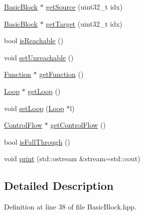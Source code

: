 \begin{DoxyCompactItemize}
\item 
\hyperlink{class_e_p_a_x_1_1_basic_block}{\-Basic\-Block} $\ast$ \hyperlink{class_e_p_a_x_1_1_basic_block_a9b7d0cd1393c05a1953a220656397e32}{get\-Source} (uint32\-\_\-t idx)
\item 
\hyperlink{class_e_p_a_x_1_1_basic_block}{\-Basic\-Block} $\ast$ \hyperlink{class_e_p_a_x_1_1_basic_block_a512b57294aa6304a46dbe6078a3136c6}{get\-Target} (uint32\-\_\-t idx)
\item 
bool \hyperlink{class_e_p_a_x_1_1_basic_block_a88793cef3edbefc895901a79a13960af}{is\-Reachable} ()
\item 
void \hyperlink{class_e_p_a_x_1_1_basic_block_a66989faa2f50f05ef54f590804da67d6}{set\-Unreachable} ()
\item 
\hyperlink{class_e_p_a_x_1_1_function}{\-Function} $\ast$ \hyperlink{class_e_p_a_x_1_1_basic_block_a4093d6913b2268f3598001afdcea64be}{get\-Function} ()
\item 
\hyperlink{class_e_p_a_x_1_1_loop}{\-Loop} $\ast$ \hyperlink{class_e_p_a_x_1_1_basic_block_a52b1b3f29e3e9a3b2e5bf5fc0b9057b4}{get\-Loop} ()
\item 
void \hyperlink{class_e_p_a_x_1_1_basic_block_a068cccb297ebae18119a804a2474e45a}{set\-Loop} (\hyperlink{class_e_p_a_x_1_1_loop}{\-Loop} $\ast$l)
\item 
\hyperlink{class_e_p_a_x_1_1_control_flow}{\-Control\-Flow} $\ast$ \hyperlink{class_e_p_a_x_1_1_basic_block_a4ec01047f0b018b4f0e13815c1fd7d38}{get\-Control\-Flow} ()
\item 
bool \hyperlink{class_e_p_a_x_1_1_basic_block_a3629d78dc7e8602a3368662f7c1aff8b}{is\-Fall\-Through} ()
\item 
void \hyperlink{class_e_p_a_x_1_1_basic_block_a9c896274d03999978e255ab2332c649c}{print} (std\-::ostream \&stream=std\-::cout)
\end{DoxyCompactItemize}


\subsection{\-Detailed \-Description}


\-Definition at line 38 of file \-Basic\-Block.\-hpp.



